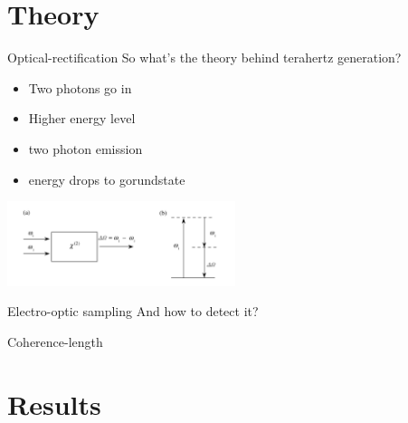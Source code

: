\documentclass[aspectratio=1610, 9pt]{beamer}
\begin{document}
\section{Theory}
\begin{frame}{Optical-rectification}
  So what's the theory behind terahertz generation?
  \begin{itemize}
    \item Two photons go in
    \item Higher energy level
    \item two photon emission 
    \item energy drops to gorundstate
  \end{itemize}
  \includegraphics[width=0.5\textwidth]{images/diffrence_frequency_mixing.PNG}
\end{frame}

\begin{frame}{Electro-optic sampling}
  And how to detect it?

\end{frame}

\begin{frame}{Coherence-length}

\end{frame}

\section{Results}
\end{document}
